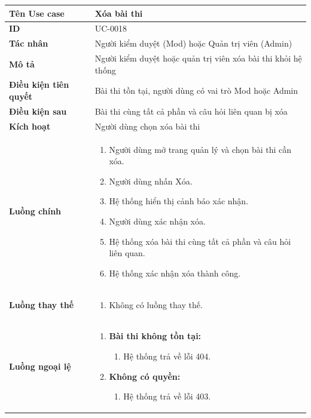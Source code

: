 {
\renewcommand{\arraystretch}{1.5}

\begin{tabularx}{\textwidth}{|>{\raggedright\arraybackslash}X|>{\raggedright\arraybackslash}X|}
\hline
\textbf{Tên Use case} & Xóa bài thi \\
\hline
\textbf{ID} & UC-0018 \\
\hline
\textbf{Tác nhân} & Người kiểm duyệt (Mod) hoặc Quản trị viên (Admin) \\
\hline
\textbf{Mô tả} & Người kiểm duyệt hoặc quản trị viên xóa bài thi khỏi hệ thống \\
\hline
\textbf{Điều kiện tiên quyết} & Bài thi tồn tại, người dùng có vai trò Mod hoặc Admin \\
\hline
\textbf{Điều kiện sau} & Bài thi cùng tất cả phần và câu hỏi liên quan bị xóa \\
\hline
\textbf{Kích hoạt} & Người dùng chọn xóa bài thi \\
\hline
\textbf{Luồng chính} &
\begin{enumerate}
    \item Người dùng mở trang quản lý và chọn bài thi cần xóa.
    \item Người dùng nhấn Xóa.
    \item Hệ thống hiển thị cảnh báo xác nhận.
    \item Người dùng xác nhận xóa.
    \item Hệ thống xóa bài thi cùng tất cả phần và câu hỏi liên quan.
    \item Hệ thống xác nhận xóa thành công.
\end{enumerate} \\
\hline
\textbf{Luồng thay thế} &
\begin{enumerate}
    \item Không có luồng thay thế.
\end{enumerate} \\
\hline
\textbf{Luồng ngoại lệ} &
\begin{enumerate}
    \item \textbf{Bài thi không tồn tại:}
    \begin{enumerate}
        \item[1Err.] Hệ thống trả về lỗi 404.
    \end{enumerate}
    \item \textbf{Không có quyền:}
    \begin{enumerate}
        \item[1Err2.] Hệ thống trả về lỗi 403.
    \end{enumerate}
\end{enumerate} \\
\hline
\end{tabularx}
}
